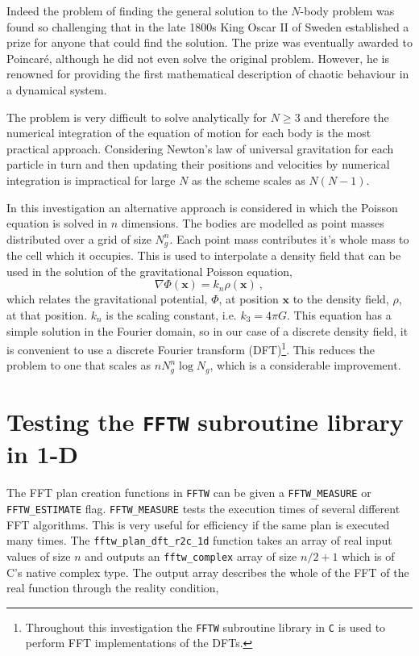 \documentclass[10pt,a4paper]{article}
\begin{document}
Indeed the problem of finding the general solution to the $N$-body problem was found so challenging that in the late 1800s King Oscar II of Sweden established a prize for anyone that could find the solution. The prize was eventually awarded to Poincar\'{e}, although he did not even solve the original problem. However, he is renowned for providing the first mathematical description of chaotic behaviour in a dynamical system.

The problem is very difficult to solve analytically for $N \geq 3$ and therefore the numerical integration of the equation of motion for each body is the most practical approach. Considering Newton's law of universal gravitation for each particle in turn and then updating their positions and velocities by numerical integration is impractical for large $N$ as the scheme scales as $N(N-1)$.

In this investigation an alternative approach is considered in which the Poisson equation is solved in $n$ dimensions. The bodies are modelled as point masses distributed over a grid of size $N_g^n$. Each point mass contributes it's whole mass to the cell which it occupies. This is used to interpolate a density field that can be used in the solution of the gravitational Poisson equation,
\begin{equation}
\nabla\Phi(\textbf{x}) = k_n \rho(\textbf{x})\:,
\end{equation}
which relates the gravitational potential, $\Phi$, at position $\textbf{x}$ to the density field, $\rho$, at that position. $k_n$ is the scaling constant, i.e. $k_3=4\pi G$. This equation has a simple solution in the Fourier domain, so in our case of a discrete density field, it is convenient to use a discrete Fourier transform (DFT)\footnote{Throughout this investigation the \texttt{FFTW} subroutine library in \texttt{C} is used to perform FFT implementations of the DFTs.}. This reduces the problem to one that scales as $nN_g^n\log N_g$, which is a considerable improvement.

\section{Testing the \texttt{FFTW} subroutine library in 1-D}
The FFT plan creation functions in \texttt{FFTW} can be given a \texttt{FFTW\_MEASURE} or \texttt{FFTW\_ESTIMATE} flag. \texttt{FFTW\_MEASURE} tests the execution times of several different FFT algorithms. This is very useful for efficiency if the same plan is executed many times. The \texttt{fftw\_plan\_dft\_r2c\_1d} function takes an array of real input values of size $n$ and outputs an \texttt{fftw\_complex} array of size $n/2+1$ which is of C's native complex type. The output array describes the whole of the FFT of the real function through the reality condition,
\end{document}
